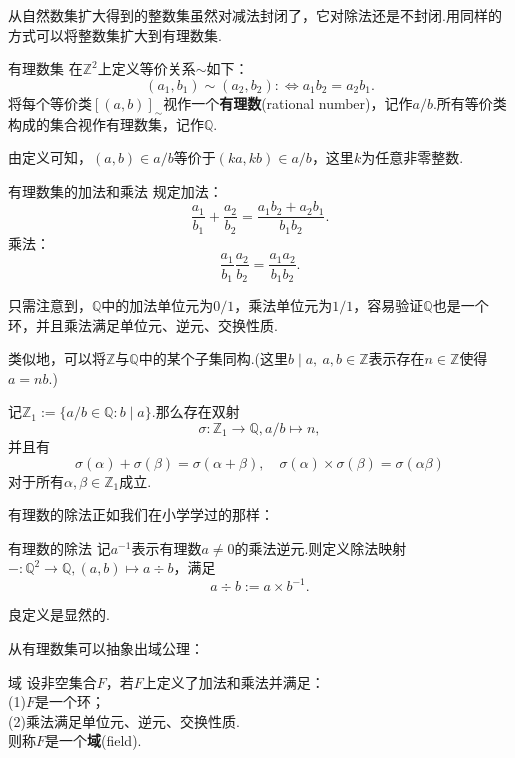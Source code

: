 \documentclass[lang=cn, zihao=5]{elegantbook}
\newcommand{\Z}{\mathbb{Z}}
\begin{document}
从自然数集扩大得到的整数集虽然对减法封闭了，它对除法还是不封闭.用同样的方式可以将整数集扩大到有理数集.

\begin{definition}{有理数集}
	在$\mathbb{Z}^2$上定义等价关系$\sim$如下：$$(a_1,b_1) \sim (a_2,b_2) :\Leftrightarrow a_1b_2=a_2b_1.$$
	将每个等价类$[(a,b)]_{\sim}$视作一个\textbf{有理数}(rational number)，记作$a/b$.所有等价类构成的集合视作有理数集，记作$\mathbb{Q}$.
\end{definition}

由定义可知，$(a,b)\in a/b$等价于$(ka,kb) \in a/b$，这里$k$为任意非零整数.

\begin{definition}{有理数集的加法和乘法}
	规定加法：$$\frac{a_1}{b_1} + \frac{a_2}{b_2} = \frac{a_1b_2+a_2b_1}{b_1b_2}.$$
	乘法：
	$$\frac{a_1}{b_1} \frac{a_2}{b_2} = \frac{a_1a_2}{b_1b_2}.$$
\end{definition}

只需注意到，$\mathbb{Q}$中的加法单位元为$0/1$，乘法单位元为$1/1$，容易验证$\mathbb{Q}$也是一个环，并且乘法满足单位元、逆元、交换性质.

类似地，可以将$\Z$与$\mathbb{Q}$中的某个子集同构.(这里$b \mid a,~a,b \in \Z$表示存在$n \in \Z$使得$a=nb$.)

\begin{proposition}
	记$\mathbb{Z}_1:=\{ a/b \in \mathbb{Q}:b \mid a \}$.那么存在双射$$\sigma :\mathbb{Z}_1 \to \mathbb{Q},a/b \mapsto n,$$
	并且有$$\sigma (\alpha) + \sigma (\beta) = \sigma (\alpha + \beta),\quad \sigma (\alpha) \times \sigma (\beta) = \sigma (\alpha  \beta)$$
	对于所有$\alpha ,\beta \in \mathbb{Z}_1$成立.
\end{proposition}

有理数的除法正如我们在小学学过的那样：

\begin{definition}{有理数的除法}
	记$a^{-1}$表示有理数$a\neq 0$的乘法逆元.则定义除法映射$-:\mathbb{Q} ^2 \to \mathbb{Q} ,(a,b) \mapsto a \div b$，满足$$a \div b:=a\times b^{-1}.$$
\end{definition}

良定义是显然的.

从有理数集可以抽象出域公理：

\begin{axiom}{域}
	设非空集合$F$，若$F$上定义了加法和乘法并满足： \\
	(1)$F$是一个环； \\
	(2)乘法满足单位元、逆元、交换性质. \\
	则称$F$是一个\textbf{域}(field).
\end{axiom}
\end{document}
